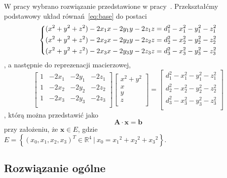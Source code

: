W pracy wybrano rozwiązanie przedstawione w pracy~\cite{norrdine2012algebraic}. Przekształćmy podstawowy układ równań~\ref{eq:base} do postaci
\begin{equation}
    \begin{dcases}
        (x^2 + y^2 + z^2) - 2x_1x - 2y_1y - 2z_1z = d_1^2 - x_1^2 - y_1^2 - z_1^2\\
        (x^2 + y^2 + z^2) - 2x_2x - 2y_2y - 2z_2z = d_2^2 - x_2^2 - y_2^2 - z_2^2\\
        (x^2 + y^2 + z^2) - 2x_3x - 2y_3y - 2z_3z = d_3^2 - x_3^2 - y_3^2 - z_3^2\\
    \end{dcases}
\end{equation},
a następnie do reprezenacji macierzowej,
\begin{equation}
    \left[
        \begin{matrix}
            1 & -2x_1 & -2y_1 & -2z_1\\
            1 & -2x_2 & -2y_2 & -2z_2\\
            1 & -2x_3 & -2y_3 & -2z_3\\
        \end{matrix}
    \right]
    \left[
        \begin{matrix}
            x^2 + y^2\\
            x\\
            y\\
            z\\
        \end{matrix}
    \right]
    =
    \left[
        \begin{matrix}
            d_1^2 - x_1^2 - y_1^2 - z_1^2\\
            d_2^2 - x_2^2 - y_2^2 - z_2^2\\
            d_3^2 - x_3^2 - y_3^2 - z_3^2\\
        \end{matrix}
    \right]
\end{equation},
którą można przedstawić jako
\begin{equation}
    \mathbf{A} \cdot \mathbf{x} = \mathbf{b}
\label{eq:matrix}
\end{equation}
przy założeniu, że $\mathbf{x} \in E$, gdzie $E = \left\{(x_0, x_1, x_2, x_3)^T \in {\mathbb{R}}^4\ |\ x_0 = {x_1}^2 + {x_2}^2 + {x_3}^2\right\}$.

\subsection*{Rozwiązanie ogólne}

